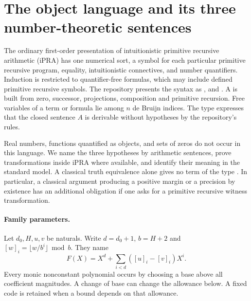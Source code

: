 \section{The object language and its three number-theoretic sentences}\label{sec:foundation}
The ordinary first-order presentation of intuitionistic primitive recursive arithmetic (iPRA) has one numerical sort, a symbol for each particular primitive recursive program, equality, intuitionistic connectives, and number quantifiers. Induction is restricted to quantifier-free formulas, which may include defined primitive recursive symbols. The repository presents the syntax as ,  and . A  is built from zero, successor, projections, composition and primitive recursion. Free variables of a term or formula lie among $n$ de Bruijn indices. The type  expresses that the closed sentence $A$ is derivable without hypotheses by the repository's rules.

Real numbers, functions quantified as objects, and sets of zeros do not occur in this language. We name the three hypotheses by arithmetic sentences, prove transformations inside iPRA where available, and identify their meaning in the standard model. A classical truth equivalence alone gives no term of the type . In particular, a classical argument producing a positive margin or a precision by existence has an additional obligation if one asks for a primitive recursive witness transformation.

\paragraph{Family parameters.}
Let $d_0,H,u,v$ be naturals. Write $d=d_0+1$, $b=H+2$ and $[w]_i=\lfloor w/b^i\rfloor\bmod b$. They name
\[
 F(X)=X^d+\sum_{i<d}([u]_i-[v]_i)X^i.
\]
Every monic nonconstant polynomial occurs by choosing a base above all coefficient magnitudes. A change of base can change the allowance below. A fixed code is retained when a bound depends on that allowance.

